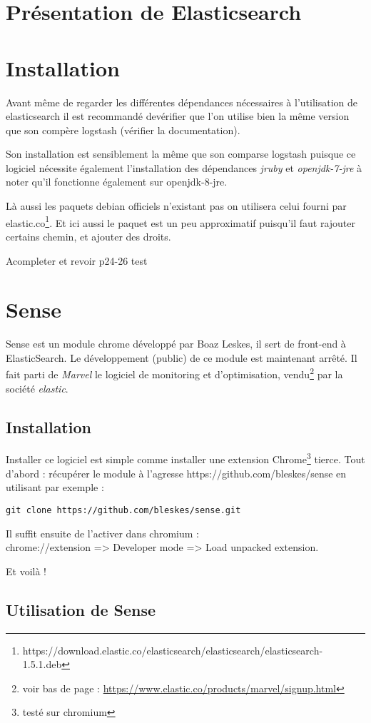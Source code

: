 \section{Présentation de Elasticsearch}


\section{Installation}
Avant même de regarder les différentes dépendances nécessaires à l'utilisation de
elasticsearch il est recommandé devérifier que l'on utilise bien la même version
que son compère logstash (vérifier la documentation).

Son installation est sensiblement la même que son comparse logstash puisque ce logiciel 
nécessite également l'installation des dépendances \emph{jruby} et \emph{openjdk-7-jre}
à noter qu'il fonctionne également sur openjdk-8-jre.

Là aussi les paquets debian officiels n'existant pas on utilisera celui fourni par 
elastic.co\footnote{https://download.elastic.co/elasticsearch/elasticsearch/elasticsearch-1.5.1.deb}.
Et ici aussi le paquet est un peu approximatif puisqu'il faut rajouter certains chemin, et ajouter des droits.




Acompleter et revoir
p24-26
 test


\section{Sense}
Sense est un module chrome développé par Boaz Leskes, il sert de front-end à ElasticSearch.
Le développement (public) de ce module est maintenant arrêté. Il fait parti de 
\emph{Marvel} le logiciel de monitoring et d'optimisation, vendu\footnote{voir bas 
de page : \url{https://www.elastic.co/products/marvel/signup.html}} 
par la société \emph{elastic}.


\subsection{Installation}
Installer ce logiciel est simple comme installer une extension Chrome\footnote{testé sur chromium}
tierce.
Tout d'abord : récupérer le module à l'agresse  https://github.com/bleskes/sense 
en utilisant par exemple : 
\begin{lstlisting}[style=code]
git clone https://github.com/bleskes/sense.git
\end{lstlisting}

Il suffit ensuite de l'activer dans chromium :\\ 
chrome://extension => Developer mode => Load unpacked extension.

Et voilà !

\subsection{Utilisation de Sense}
